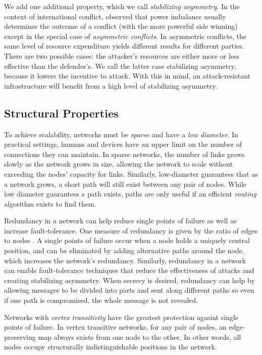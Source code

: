 \documentclass[prodmode,permissions]{acmsmall-ec16}
\begin{document}
We add one additional property, which we call {\em stabilizing asymmetry}.
In the context of international conflict,
\cite{mack_why_1975}
observed that power imbalance usually determines the outcome of a conflict
(with the more powerful side winning)
except in the special case of {\em asymmetric conflicts}.
In asymmetric conflicts, the same level of resource expenditure yields different
results for different parties.
There are two possible cases:
the attacker's resources are either more or less effective than the defender's.
We call the latter case stabilizing asymmetry,
because it lowers the incentive to attack.
With this in mind, an attack-resistant infrastructure will benefit from a high
level of stabilizing asymmetry.

\subsection{Structural Properties}

To achieve scalability, networks must be {\em sparse} and have a
{\em low diameter}.
In practical settings, humans and devices have an upper limit on the number
of connections they can maintain.
In sparse networks, the number of links grows slowly as the network grows in
size, allowing the network to scale without exceeding the nodes' capacity for
links.
Similarly, low-diameter guarantees that as a network grows, a short path will
still exist between any pair of nodes.
While low diameter guarantees a path exists,
paths are only useful if an efficient {\em routing} algorithm exists
to find them.

Redundancy in a network can help reduce single points of failure as well as
increase fault-tolerance.
One measure of redundancy is given by the ratio of edges to nodes
\cite{baran_distributed_1964}.
A single points of failure occur when a node holds a uniquely
central position,
and can be eliminated by adding alternative
paths around the node,
which increases the network's redundancy.
Similarly, redundancy in a network can enable fault-tolerance techniques
that reduce the effectiveness of attacks and creating stabilizing asymmetry.
When secrecy is desired, redundancy can help by allowing messages to be
divided into parts and sent along different paths so even if one path is
compromised, the whole message is not revealed.

Networks with {\em vertex transitivity} have the greatest protection agasint
single points of failure.
In vertex transitive networks, for any pair of nodes, an edge-preserving map
always exists from one node to the other.
In other words, all nodes occupy structurally indistinguishable positions
in the network.
\end{document}
